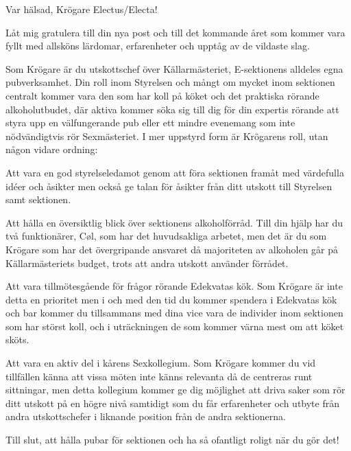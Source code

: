 \documentclass[10pt]{article}
\begin{document}
\heading{\doctitle}

Var hälsad, Krögare Electus/Electa!

Låt mig gratulera till din nya post och till det kommande året som kommer vara fyllt med allsköns lärdomar, erfarenheter och upptåg av de vildaste slag.

Som Krögare är du utskottschef över Källarmästeriet, E-sektionens alldeles egna pubverksamhet. Din roll inom Styrelsen och mångt om mycket inom sektionen centralt kommer vara den som har koll på köket och det praktiska rörande alkoholutbudet, där aktiva kommer söka sig till dig för din expertis rörande att styra upp en välfungerande pub eller ett mindre evenemang som inte nödvändigtvis rör Sexmästeriet. I mer uppstyrd form är Krögarens roll, utan någon vidare ordning:

\begin{dashlist}
    \item Att vara en god styrelseledamot genom att föra sektionen framåt med värdefulla idéer och åsikter men också ge talan för åsikter från ditt utskott till Styrelsen samt sektionen.

	\item Att hålla en översiktlig blick över sektionens alkoholförråd. Till din hjälp har du två funktionärer, Cøl, som har det huvudsakliga arbetet, men det är du som Krögare som har det övergripande ansvaret då majoriteten av alkoholen går på Källarmästeriets budget, trots att andra utskott använder förrådet.

	\item Att vara tillmötesgående för frågor rörande Edekvatas kök. Som Krögare är inte detta en prioritet men i och med den tid du kommer spendera i Edekvatas kök och bar kommer du tillsammans med dina vice vara de individer inom sektionen som har störst koll, och i uträckningen de som kommer värna mest om att köket sköts.

	\item Att vara en aktiv del i kårens Sexkollegium. Som Krögare kommer du vid tillfällen känna att vissa möten inte känns relevanta då de centreras runt sittningar, men detta kollegium kommer ge dig möjlighet att driva saker som rör ditt utskott på en högre nivå samtidigt som du får erfarenheter och utbyte från andra utskottschefer i liknande position från de andra sektionerna.

\item Till slut, att hålla pubar för sektionen och ha så ofantligt roligt när du gör det!

\end{dashlist}
\end{document}
